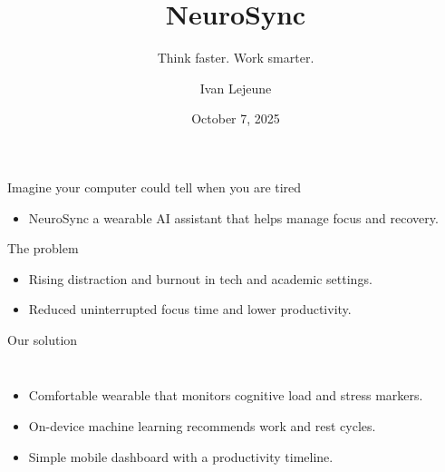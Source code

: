 \documentclass[10pt]{beamer}
\title{NeuroSync}
\subtitle{Think faster. Work smarter.}
\author{Ivan Lejeune}
\date{October 7, 2025}
\begin{document}
\begin{frame}
    \titlepage
\end{frame}

\begin{frame}{Imagine your computer could tell when you are tired}
    \vspace{0.3cm}
    \begin{itemize}
        \item NeuroSync \textemdash a wearable AI assistant that helps manage focus and recovery.
    \end{itemize}
\end{frame}

\begin{frame}{The problem}
    \begin{itemize}
        \item Rising distraction and burnout in tech and academic settings.
        \item Reduced uninterrupted focus time and lower productivity.
    \end{itemize}
    \vfill
\end{frame}

\begin{frame}{Our solution}
    \begin{columns}
        \begin{itemize}
            \item Comfortable wearable that monitors cognitive load and stress markers.
            \item On-device machine learning recommends work and rest cycles.
            \item Simple mobile dashboard with a productivity timeline.
        \end{itemize}
    \end{columns}
\end{frame}
\end{document}
